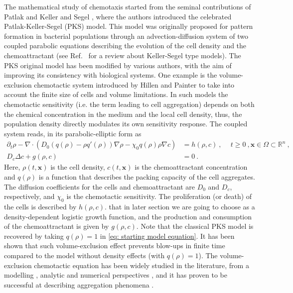 \documentclass[review,onefignum,onetabnum]{siamart220329}
\begin{document}
The mathematical study of chemotaxis started from the seminal contributions of Patlak \cite{patlak1953random} and Keller and Segel \cite{keller1970initiation,keller1971model}, where the authors introduced the celebrated Patlak-Keller-Segel (PKS) model. This model was originally proposed for pattern formation in bacterial populations through an advection-diffusion system of two coupled parabolic equations describing the evolution of the cell density and the chemoattractant (see Ref.~\cite{Hillen2009} for a review about Keller-Segel type models). %
The PKS original model has been modified by various authors, with the aim of improving its consistency with biological systems. One example is the volume-exclusion chemotactic system introduced by Hillen and Painter \cite{painter2002volume} to take into account the finite size of cells and volume limitations. In such models the chemotactic sensitivity (i.e. the term leading to cell aggregation) depends on both the chemical concentration in the medium and the local cell density, thus, the population density directly modulates its own sensitivity response. The coupled system reads, in {{its}} parabolic-elliptic form as
\begin{equation}
\begin{aligned}
    \partial_t\rho-\nabla\cdot\left(D_0(q(\rho)-\rho q'(\rho))\nabla\rho-\chi_0q(\rho)\rho\nabla c\right)&=h(\rho,c)\ , \ \quad t\geq 0\ , \mathbf{x}\in \Omega\subset\mathbb{R}^n\ ,\\
    D_c\Delta c+g(\rho,c)& = 0\ .
    \label{eq: starting model equation}
\end{aligned}
\end{equation}
Here, $\rho(t,\mathbf{x})$ is the cell density, $c(t,\mathbf{x})$ is the chemoattractant concentration and  $q(\rho)$ is a function that describes the packing capacity of the cell aggregates.  The diffusion coefficients for the cells and chemoattractant are $D_0$ and $D_c$, respectively, and $\chi_0$ is the chemotactic sensitivity. The proliferation (or death) of the cells is described by $h(\rho,c)$. that in later section we are going to choose as a density-dependent logistic growth function,  and the production and consumption of the chemoattractant is given by $g(\rho,c)$. Note that the classical PKS model is recovered by taking $q(\rho) = 1$ in \cref{eq: starting model equation}.  It has been shown \cite{wrzosek2010volume,calvez2006volume,zheng2015boundedness} that such volume-exclusion effect prevents blow-ups in finite time compared to the model without density effects (with $q(\rho) = 1$). The volume-exclusion chemotactic equation has been widely studied in
the literature, from a modelling \cite{painter2002volume,wang2010chemotaxis}, analytic \cite{wrzosek2010volume,han2017pattern,ma2012stationary,dolak2005keller} and numerical perspectives \cite{ibrahim2014efficacy}, and
it has proven to be successful at describing aggregation phenomena \cite{almeida2020treatment,bubba2019chemotaxis}. 
\end{document}
